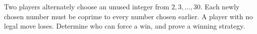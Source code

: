 Two players alternately choose an unused integer from $2,3,\ldots,30$. Each newly chosen number must be coprime to every number chosen earlier. A player with no legal move loses. Determine who can force a win, and prove a winning strategy.
